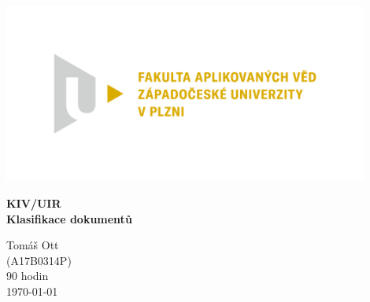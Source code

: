 \documentclass[ 12pt, a4paper]{article}
\begin{document}
\def\code#1{\texttt{#1}}

%
\centerline{\includegraphics[width=12cm]{logo.png}}
\vspace*{50px}
\begin{center}
	{\LARGE\bf\noindent KIV/UIR \\ Klasifikace dokumentů}\\
	\vspace*{40px}  
	
	Tomáš Ott\\
	(A17B0314P)\\
	90 hodin \\
	\vspace*{\fill}  
	\hspace*{\fill} \today \\
\end{center}
\newpage
\tableofcontents
\newpage

\end{document}

